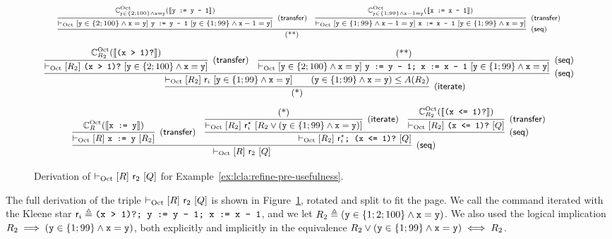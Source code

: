 \begin{sidewaysfigure}
	\[
	\scriptsize
	\infer[(\mathsf{seq})]
	{ ($**$) }
	{
		\infer[(\mathsf{transfer})]
		{ \lcl{\Oct}{\code{y} \in \{2; 100\} \land \code{x} = \code{y}}{\code{y := y - 1}}{ \code{y} \in \{1; 99\} \land \code{x} - 1 = \code{y} } }
		{ \complete{\Oct}{\code{y} \in \{2; 100\} \land \code{x} = \code{y}}{\denot{\code{y := y - 1}}} }
		&
		\infer[(\mathsf{transfer})]
		{ \lcl{\Oct}{ \code{y} \in \{1; 99\} \land \code{x} - 1 = \code{y} }{\code{x := x - 1}}{\code{y} \in \{1; 99\} \land \code{x} = \code{y}} }
		{ \complete{\Oct}{\code{y} \in \{1; 99\} \land \code{x} - 1 = \code{y}}{\denot{\code{x := x - 1}}} }
	}
	\]
	\[
	\small
	\infer[(\mathsf{iterate})]
	{ ($*$) }
	{
		\infer[(\mathsf{seq})]
		{ \lcl{\Oct}{R_2}{\regr_i}{\code{y} \in \{1; 99\} \land \code{x} = \code{y}}
			\qquad (\code{y} \in \{1; 99\} \land \code{x} = \code{y}) \le A(R_2) }
		{
			\infer[(\mathsf{transfer})]
			{ \lcl{\Oct}{R_2}{\code{(x > 1)?}}{\code{y} \in \{2; 100\} \land \code{x} = \code{y}} }
			{ \complete{\Oct}{R_2}{\denot{\code{(x > 1)?}}}}
			&
			\infer[(\mathsf{seq})]
			{ \lcl{\Oct}{\code{y} \in \{2; 100\} \land \code{x} = \code{y}}{\code{y := y - 1; x := x - 1}}{\code{y} \in \{1; 99\} \land \code{x} = \code{y}} }
			{ ($**$) }
		}
	}
	\]
	\[
	\small
	\infer[(\mathsf{seq})]
	{\lcl{\Oct}{R}{\regr_2}{Q}
	}
	{
		\infer[(\mathsf{transfer})]
		{\lcl{\Oct}{R}{\code{x := y}}{R_2}}{ \complete{\Oct}{R}{\denot{\code{x := y}}} }
		&
		\infer[(\mathsf{seq})]
		{\lcl{\Oct}{R_2}{\regr_i^{\kstar}\code{; (x <= 1)?}}{Q}}
		{
			\infer[(\mathsf{iterate})]
			{\lcl{\Oct}{R_2}{\regr_i^{\kstar}}{R_2 \lor (\code{y} \in \{1; 99\} \land \code{x} = \code{y})}}
			{ ($*$) }
			&
			\infer[(\mathsf{transfer})]
			{\lcl{\Oct}{R_2}{\code{(x <= 1)?}}{Q}}{ \complete{\Oct}{R_2}{\denot{\code{(x <= 1)?}}} }
		}
	}
	\]
	\caption{Derivation of $\vdash_{\text{Oct}}\nobreak[R]~\mathsf{r}_2~[Q]$ for Example~\ref{ex:lcla:refine-pre-usefulness}.}
	\label{fig:app:ex-refine-pre-derivation-2}
\end{sidewaysfigure}

\begin{example}
	The full derivation of the triple $\vdash_{\text{Oct}}\nobreak[R]~\mathsf{r}_2~[Q]$ is shown in Figure~\ref{fig:app:ex-refine-pre-derivation-2}, rotated and split to fit the page. We call the command iterated with the Kleene star $\mathsf{r}_i \triangleq \texttt{(x > 1)?; y := y - 1; x := x - 1}$, and we let $R_2 \triangleq (\texttt{y} \in \{1; 2; 100\} \land \texttt{x} = \texttt{y})$. We also used the logical implication $R_2 \implies (\texttt{y} \in \{1; 99\} \land \texttt{x} = \texttt{y})$, both explicitly and implicitly in the equivalence $R_2 \lor (\texttt{y} \in \{1; 99\} \land \texttt{x} = \texttt{y}) \iff R_2$.
\end{example}

